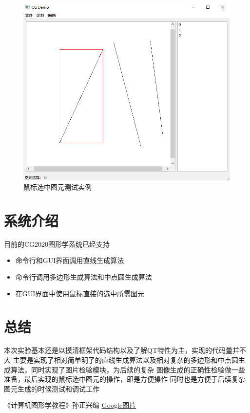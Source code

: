 \documentclass[a4paper,UTF8]{article}
\theoremstyle{definition}
\begin{document}
\begin{figure}[htbp]
{\begin{minipage}{7cm}
        \includegraphics[scale=0.2]{figure/choose2.png}   %
        \end{minipage}
    }
     
    \caption{鼠标选中图元测试实例} %
    \label{fig:1}  %
\end{figure}


\section{系统介绍}
目前的CG2020图形学系统已经支持
\begin{itemize}
    \item 命令行和GUI界面调用直线生成算法
    \item 命令行调用多边形生成算法和中点圆生成算法
    \item 在GUI界面中使用鼠标直接的选中所需图元
\end{itemize}

\section{总结}
本次实验基本还是以摸清框架代码结构以及了解QT特性为主，实现的代码量并不大
主要是实现了相对简单明了的直线生成算法以及相对复杂的多边形和中点圆生成算法，同时实现了图片检验模块，为后续的复杂
图像生成的正确性检验做一些准备，最后实现的鼠标选中图元的操作，即是方便操作
同时也是方便于后续复杂图元生成的时候测试和调试工作




\begin{thebibliography}{99}  
    《计算机图形学教程》孙正兴编 
     \href{https://www.google.com/imghp?hl=zh-CN&ogbl}{Google图片}
\end{thebibliography}
\end{document}
